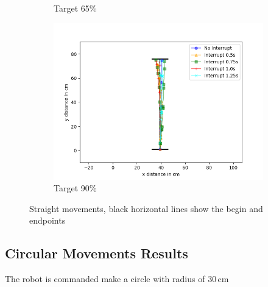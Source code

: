 \begin{figure}
\begin{subfigure}[b]{0.62\textwidth}
		\caption{Target 65\%}
		\label{fig:stra_exp2}
	\end{subfigure}
	\begin{subfigure}[b]{0.62\textwidth}
		\includegraphics[width=\textwidth]{pics/straight_90.png}
		\caption{Target 90\%}
		\label{fig:stra_exp3}
	\end{subfigure}
	\caption{Straight movements, black horizontal lines show the begin and endpoints}
\end{figure}


\subsection{Circular Movements Results}

The robot is commanded make a circle with radius of 30\,cm


